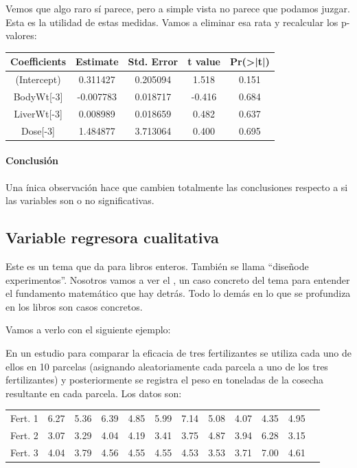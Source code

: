 Vemos que algo raro sí parece, pero a simple vista no parece que podamos juzgar. Esta es la utilidad de estas medidas. Vamos a eliminar esa rata y recalcular los p-valores:

\begin{center}
\begin{tabular}{ccccc}
Coefficients&Estimate&Std. Error&t value&Pr(>|t|)\\\hline
(Intercept)&0.311427&0.205094&1.518&0.151\\
BodyWt[-3]&-0.007783&0.018717&-0.416&0.684\\
LiverWt[-3]&0.008989&0.018659&0.482&0.637\\
Dose[-3]&1.484877&3.713064&0.400&0.695
\end{tabular}
\end{center}

\paragraph{Conclusión}
Una ínica observación hace que cambien totalmente las conclusiones respecto a si las variables son o no significativas.


\subsection{Variable regresora cualitativa}

Este es un tema que da para libros enteros. También se llama ``diseñode experimentos''. Nosotros vamos a ver el , un caso concreto del tema para entender el fundamento matemático que hay detrás. Todo lo demás en lo que se profundiza en los libros son casos concretos.

Vamos a verlo con el siguiente ejemplo:

En un estudio para comparar la eficacia de tres fertilizantes se utiliza
cada uno de ellos en 10 parcelas (asignando aleatoriamente cada parcela
a uno de los tres fertilizantes) y posteriormente se registra el peso en
toneladas de la cosecha resultante en cada parcela. Los datos son:

\begin{center}
\begin{tabular}{|c|ccccccccccc|}
\hline
	Fert. 1 & 6.27 & 5.36 & 6.39 & 4.85 & 5.99 & 7.14 & 5.08 & 4.07 & 4.35 & 4.95\\
	Fert. 2 & 3.07 & 3.29 & 4.04 & 4.19 & 3.41 & 3.75 & 4.87 & 3.94 & 6.28 & 3.15\\
	Fert. 3 & 4.04 & 3.79 & 4.56 & 4.55 & 4.55 & 4.53 & 3.53 & 3.71 & 7.00 & 4.61\\\hline
\end{tabular}
\end{center}



